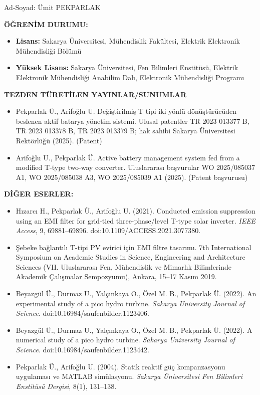 \begin{ozgecmis}
Ad-Soyad\quad{}\quad{}: Ümit PEKPARLAK

\textbf{ÖĞRENİM DURUMU:}

\begin{itemize}
  \item \textbf{Lisans\quad{}:} Sakarya Üniversitesi, Mühendislik Fakültesi, Elektrik Elektronik Mühendisliği Bölümü
  \item \textbf{Yüksek Lisans\quad{}:} Sakarya Üniversitesi, Fen Bilimleri Enstitüsü, Elektrik Elektronik Mühendisliği Anabilim Dalı, Elektronik Mühendisliği Programı
\end{itemize}

\textbf{TEZDEN TÜRETİLEN YAYINLAR/SUNUMLAR}

\begin{itemize}
  \item Pekparlak Ü., Arifoğlu U. Değiştirilmiş T tipi iki yönlü dönüştürücüden beslenen aktif batarya yönetim sistemi. Ulusal patentler TR 2023 013377 B, TR 2023 013378 B, TR 2023 013379 B; hak sahibi Sakarya Üniversitesi Rektörlüğü (2025). (Patent)
  \item Arifoğlu U., Pekparlak Ü. Active battery management system fed from a modified T-type two-way converter. Uluslararası başvurular WO 2025/085037 A1, WO 2025/085038 A3, WO 2025/085039 A1 (2025). (Patent başvurusu)
\end{itemize}

\textbf{DİĞER ESERLER:}

\begin{itemize}
  \item Hızarcı H., Pekparlak Ü., Arifoğlu U. (2021). Conducted emission suppression using an EMI filter for grid-tied three-phase/level T-type solar inverter. \textit{IEEE Access}, 9, 69881--69896. doi:10.1109/ACCESS.2021.3077380.
  \item Şebeke bağlantılı T-tipi PV evirici için EMI filtre tasarımı. 7th International Symposium on Academic Studies in Science, Engineering and Architecture Sciences (VII. Uluslararası Fen, Mühendislik ve Mimarlık Bilimlerinde Akademik Çalışmalar Sempozyumu), Ankara, 15--17 Kasım 2019.
  \item Beyazgül Ü., Durmaz U., Yalçınkaya O., Özel M. B., Pekparlak Ü. (2022). An experimental study of a pico hydro turbine. \textit{Sakarya University Journal of Science}. doi:10.16984/saufenbilder.1123406.
  \item Beyazgül Ü., Durmaz U., Yalçınkaya O., Özel M. B., Pekparlak Ü. (2022). A numerical study of a pico hydro turbine. \textit{Sakarya University Journal of Science}. doi:10.16984/saufenbilder.1123442.
  \item Pekparlak Ü., Arifoğlu U. (2004). Statik reaktif güç kompanzasyonu uygulaması ve MATLAB simülasyonu. \textit{Sakarya Üniversitesi Fen Bilimleri Enstitüsü Dergisi}, 8(1), 131--138.
\end{itemize}
\end{ozgecmis}
